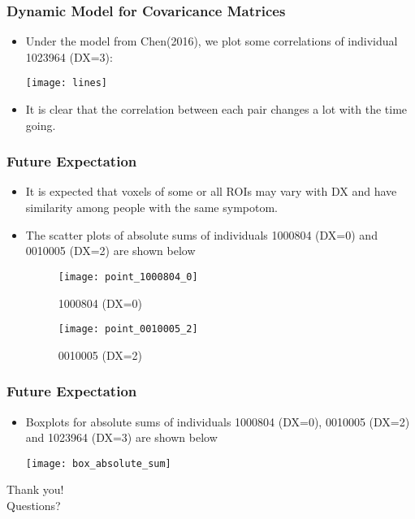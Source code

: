 \documentclass{beamer}
\begin{document}
\begin{frame}
\frametitle{Dynamic Model for Covaricance Matrices}
\begin{itemize}
\item Under the model from Chen(2016), we plot some correlations of individual 1023964 (DX=3):
\begin{center}
	\texttt{[image: lines]}
\end{center}
\item It is clear that the correlation between each pair changes a lot with the time going.
\end{itemize}

\end{frame}

\begin{frame}
\frametitle{Future Expectation}
\begin{itemize}
	\item It is expected that voxels of some or all ROIs may vary with DX and have similarity among people with the same sympotom.
	\item The scatter plots of absolute sums of individuals 1000804 (DX=0) and 0010005 (DX=2) are shown below
	\begin{figure}
		\begin{minipage}[t]{0.45\linewidth}
			\centering
			\texttt{[image: point\_1000804\_0]}
			\caption{1000804 (DX=0)}
		\end{minipage}
		\begin{minipage}[t]{0.45\linewidth}
			\centering
			\texttt{[image: point\_0010005\_2]}
			\caption{0010005 (DX=2)}
		\end{minipage}
	\end{figure}
	
\end{itemize}

\end{frame}

\begin{frame}
\frametitle{Future Expectation}
\begin{itemize}
	\item Boxplots for absolute sums of individuals 1000804 (DX=0), 0010005 (DX=2) and 1023964 (DX=3) are shown below
	\begin{center}
		\texttt{[image: box\_absolute\_sum]}
	\end{center}
	
\end{itemize}

\end{frame}

\begin{frame}
\begin{center}
	\huge{Thank you!}\\
	\tiny{Questions?}
	
\end{center}
\end{frame}

%
%
\end{document}
